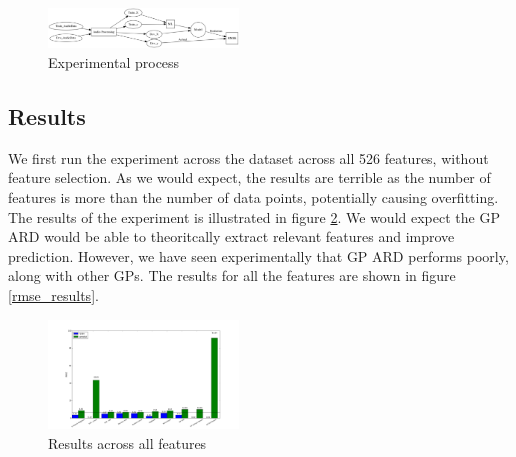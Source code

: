 \documentclass{article}
\begin{document}
	\begin{figure}[h]
 		\begin{center}
		\includegraphics[width=0.45\textwidth]{process} 
  		\end{center}
  		\caption{Experimental process}
  		\label{process} 
 	\end{figure}

	\subsection{Results}
	We first run the experiment across the dataset across all 526 features, without feature selection. As we would expect\cite{Cawley2014}, the results are terrible as the number of features is more than the number of 
	data points, potentially
	 causing overfitting. The results of the experiment is illustrated in figure \ref{results_all}. We would expect the GP ARD would be able to theoritcally extract relevant features and improve
	  prediction. However, we have seen experimentally that GP ARD performs poorly, along with other GPs. The results for all the features are shown in figure \ref{rmse_results}.

	\begin{figure}[h]
 		\begin{center}
		\includegraphics[width=0.45\textwidth]{results_all} 
  		\end{center}
  		\caption{Results across all features}
  		\label{results_all}
 	\end{figure}
	
\end{document}

